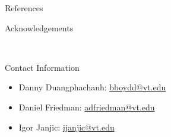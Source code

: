 \documentclass[final]{beamer}
\newlength{\onecolwid}
\begin{document}
\begin{frame}[t]
\begin{columns}[t]
\begin{column}{\onecolwid}

\begin{block}{References}

\nocite{*} %
\small{
\vspace{0.75in}}

\end{block}



\begin{block}{Acknowledgements}

\small{} \\

\end{block}



\begin{alertblock}{Contact Information}

\begin{itemize}
\item Danny Duangphachanh: \href{mailto:bboydd@vt.edu}{bboydd@vt.edu}
\item Daniel Friedman: \href{mailto:adfriedman@vt.edu}{adfriedman@vt.edu}
\item Igor Janjic: \href{mailto:ijanjic@vt.edu}{ijanjic@vt.edu}
\end{itemize}


\end{alertblock}
\end{column}
\end{columns}
\end{frame}
\end{document}
